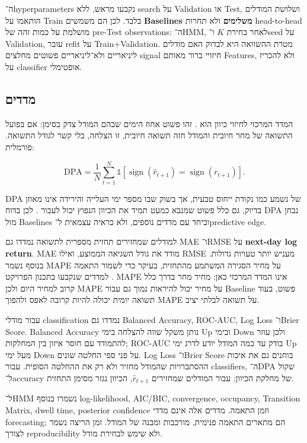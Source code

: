 ה־hyperparameters נקבעו מראש, ללא search על Validation או Test, ושלושת המודלים הותאמו על Train בלבד. לכן הם משמשים \textbf{Baselines משלימים} ולא תחרות head-to-head מושלמת על כמות זהה של pre-Test observations: ה־HMM, לאחר בחירת \(K\) ו־seed על Validation, עובר refit על Train+Validation. מטרת ההשוואה היא לבדוק האם מודלים ליניאריים ולא־ליניאריים פשוטים מחלצים signal חיזויי ברור מאותם Features, ולא להכריז על classifier אופטימלי.

\subsection{מדדים}

המדד המרכזי לחיזוי כיוון הוא . זהו פשוט אחוז הימים שבהם המודל צדק בסימן: אם בפועל התשואה של מחר חיובית והמודל חזה תשואה חיובית, זו הצלחה, בלי קשר לגודל התשואה. פורמלית:

\begin{equation}
\mathrm{DPA}=\frac{1}{N}\sum_{t=1}^{N}\mathbb{1}\left[\operatorname{sign}(\hat r_{t+1})=\operatorname{sign}(r_{t+1})\right].
\end{equation}

DPA של  נשמע כמו נקודת ייחוס טבעית, אך בשוק שבו מספר ימי העלייה והירידה אינו מאוזן בדיוק, גם כלל פשוט שמנבא כמעט תמיד את הכיוון הנפוץ יכול לעבור . לכן בדוח DPA נבחן מול Baselines וביחד עם מדדים נוספים, ולא כראיה עצמאית ל־predictive edge.

למודלים שמחזירים תחזית מספרית לתשואה נמדדו גם MAE ו־RMSE על \textbf{next-day log return}. MAE מודד את גודל השגיאה הממוצע, ואילו RMSE מעניש יותר טעויות גדולות. בנוסף נשמר MAPE על מחיר הסגירה המשתמע מהתחזית, בעיקר כדי לשמור התאמה למדדים שנקבעו בתכנון הפרויקט \cite{hyndman2006another}. MAPE אינו המדד המרכזי כאן: מחיר מחר בדרך כלל קרוב למחיר היום ולכן MAPE על מחיר יכול להיראות נמוך גם עבור Baseline פשוט, בעוד תשואה יומית יכולה להיות קרובה לאפס ולהפוך MAPE על תשואה לבלתי יציב.

עבור מודלי classification נמדדו גם Balanced Accuracy, ROC-AUC, Log Loss ו־Brier Score. Balanced Accuracy נותן משקל שווה להצלחה בימי Up ובימי Down ולכן עוזר להתמודד עם חוסר איזון בין המחלקות; ROC-AUC בודק עד כמה המודל יודע לדרג ימי Up מעל ימי Down על פני ספי החלטה שונים. Log Loss ו־Brier Score בוחנים גם את איכות ההסתברויות שהמודל מחזיר ולא רק את ההחלטה הסופית. עבור classifiers, ה־DPA שקול ל־accuracy של מחלקת הכיוון; עבור המודלים שמחזירים \(\hat r_{t+1}\), הכיוון נגזר מסימן התחזית.

ל־HMM נשמרו בנוסף log-likelihood, AIC/BIC, convergence, occupancy, Transition Matrix, dwell time, posterior confidence וזמן התאמה. מדדים אלה אינם מדדי forecasting; הם מתארים התאמה פנימית, מורכבות ומבנה של המודל. זמן הריצה נשמר לצורך reproducibility ולא שימש לבחירת מודל.

